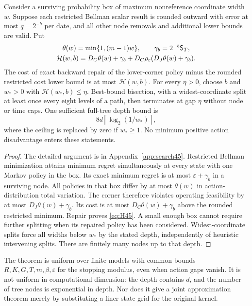 \begin{theorem}\label{thm:search45}
Consider a surviving probability box of maximum nonreference coordinate width $w$. Suppose each restricted Bellman scalar result is rounded outward with error at most $q=2^{-b}$ per date, and all other node removals and additional lower bounds are valid. Put
\begin{equation}\label{eq:H45}
\begin{gathered}
 \theta(w)=\min\{1,(m-1)w\},\qquad \gamma_b=2^{-b}\mathsf S_{T},\\
 \mathcal H(w,b)=D_C\theta(w)+\gamma_b+
                   D_C\rho_\varepsilon(D_J\theta(w)+\gamma_b).
 \end{gathered}
\end{equation}
The cost of exact backward repair of the lower-corner policy minus the rounded restricted cost lower bound is at most $\mathcal H(w,b)$. For every $\eta>0$, choose $b$ and $w_*>0$ with $\mathcal H(w_*,b)\le\eta$. Best-bound bisection, with a widest-coordinate split at least once every eight levels of a path, then terminates at gap $\eta$ without node or time caps. One sufficient full-tree depth bound is
\begin{equation}\label{eq:depth45}
 8d\left\lceil\log_2(1/w_*)\right\rceil,
\end{equation}
where the ceiling is replaced by zero if $w_*\ge1$. No minimum positive action disadvantage enters these statements.
\end{theorem}
\begin{proof}
The detailed argument is in Appendix~\ref{app:search45}. Restricted Bellman minimization attains minimum regret simultaneously at every state with one Markov policy in the box. Its exact minimum regret is at most $\varepsilon+\gamma_b$ in a surviving node. All policies in that box differ by at most $\theta(w)$ in action-distribution total variation. The corner therefore violates operating feasibility by at most $D_J\theta(w)+\gamma_b$. Its cost is at most $D_C\theta(w)+\gamma_b$ above the rounded restricted minimum. Repair proves \eqref{eq:H45}. A small enough box cannot require further splitting when its repaired policy has been considered. Widest-coordinate splits force all widths below $w_*$ by the stated depth, independently of heuristic intervening splits. There are finitely many nodes up to that depth.
\end{proof}
The theorem is uniform over finite models with common bounds $R,K,G,T,m,\beta,\varepsilon$ for the stopping modulus, even when action gaps vanish. It is not uniform in computational dimension: the depth contains $d$, and the number of tree nodes is exponential in depth. Nor does it give a joint approximation theorem merely by substituting a finer state grid for the original kernel.

